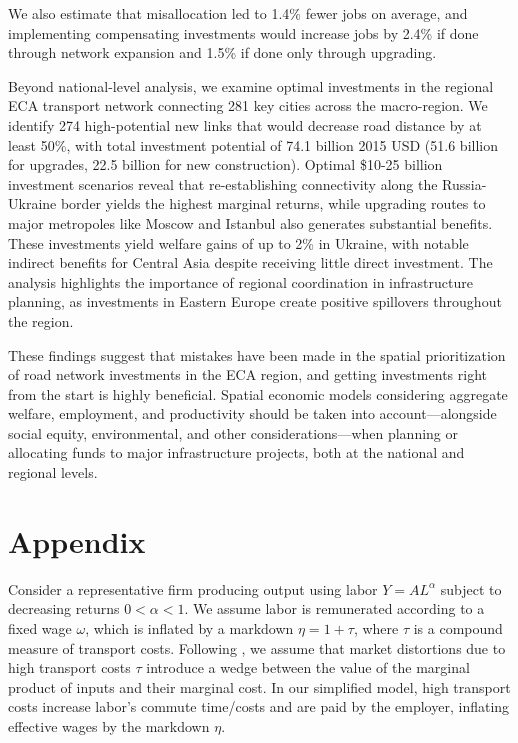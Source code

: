 \documentclass[a4paper]{article}
\begin{document}
We also estimate that misallocation led to 1.4\% fewer jobs on average, and implementing compensating investments would increase jobs by 2.4\% if done through network expansion and 1.5\% if done only through upgrading. \newline

Beyond national-level analysis, we examine optimal investments in the regional ECA transport network connecting 281 key cities across the macro-region. We identify 274 high-potential new links that would decrease road distance by at least 50\%, with total investment potential of 74.1 billion 2015 USD (51.6 billion for upgrades, 22.5 billion for new construction). Optimal \$10-25 billion investment scenarios reveal that re-establishing connectivity along the Russia-Ukraine border yields the highest marginal returns, while upgrading routes to major metropoles like Moscow and Istanbul also generates substantial benefits. These investments yield welfare gains of up to 2\% in Ukraine, with notable indirect benefits for Central Asia despite receiving little direct investment. The analysis highlights the importance of regional coordination in infrastructure planning, as investments in Eastern Europe create positive spillovers throughout the region. \newline

These findings suggest that mistakes have been made in the spatial prioritization of road network investments in the ECA region, and getting investments right from the start is highly beneficial. Spatial economic models considering aggregate welfare, employment, and productivity should be taken into account---alongside social equity, environmental, and other considerations---when planning or allocating funds to major infrastructure projects, both at the national and regional levels.




\newpage

\appendix

\setcounter{figure}{0}
\renewcommand{\thefigure}{A\arabic{figure}}

\section*{Appendix}

Consider a representative firm producing output using labor $Y = AL^{\alpha}$ subject to decreasing returns $0 < \alpha < 1$. We assume labor is remunerated according to a fixed wage $\omega$, which is inflated by a markdown $\eta = 1 + \tau$, where $\tau$ is a compound measure of transport costs. Following \citet{hornbeck2024growth}, we assume that market distortions due to high transport costs $\tau$ introduce a wedge between the value of the marginal product of inputs and their marginal cost. In our simplified model, high transport costs increase labor's commute time/costs and are paid by the employer, inflating effective wages by the markdown $\eta$. \newline 
\end{document}
